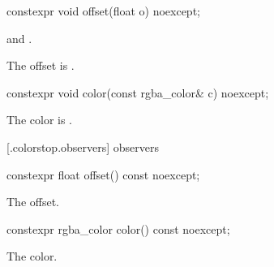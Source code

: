 %
\begin{itemdecl}
constexpr void offset(float o) noexcept;
\end{itemdecl}
\begin{itemdescr}
\pnum
\requires
{} and .

\pnum
\effects
The offset is .
\end{itemdescr}

%
\begin{itemdecl}
constexpr void color(const rgba_color& c) noexcept;
\end{itemdecl}
\begin{itemdescr}
\pnum
\effects
The color is .
\end{itemdescr}

 [\iotwod.colorstop.observers]{ observers}

%
\begin{itemdecl}
constexpr float offset() const noexcept;
\end{itemdecl}
\begin{itemdescr}
\pnum
\returns
The offset.
\end{itemdescr}

%
\begin{itemdecl}
constexpr rgba_color color() const noexcept;
\end{itemdecl}
\begin{itemdescr}
\pnum
\returns
The color.
\end{itemdescr}
